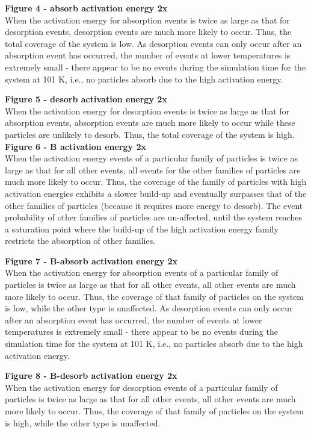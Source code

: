 \documentclass[11pt]{article}
\begin{document}
{\bf{Figure 4 - absorb activation energy 2x}}\\
When the activation energy for absorption events is twice as large as that for desorption events, desorption events are much more likely to occur. Thus, the total coverage of the system is low. As desorption events can only occur after an absorption event has occurred, the number of events at lower temperatures is extremely small  - there appear to be no events during the simulation time for the system at 101 K, i.e., no particles absorb due to the high activation energy. 


{\bf{Figure 5 - desorb activation energy 2x}}\\
When the activation energy for desorption events is twice as large as that for absorption events, absorption events are much more likely to occur while these particles are unlikely to desorb. Thus, the total coverage of the system is high. \\

{\bf{Figure 6 - B activation energy 2x}}\\
When the activation energy  events of a particular family of particles is twice as large as that for all other events, all events for the other families of particles are much more likely to occur. Thus, the coverage of the family of particles with high activation energies exhibits a slower build-up and eventually surpasses that of the other families of particles (because it requires more energy to desorb). The event probability of other families of particles are un-affected, until the system reaches a saturation point where the build-up of the high activation energy family restricts the absorption of other families.

{\bf{Figure 7 - B-absorb activation energy 2x }}\\
When the activation energy for absorption events of a particular family of particles is twice as large as that for all other events, all other events are much more likely to occur. Thus, the coverage of that family of particles on the system is low, while the other type is unaffected. As desorption events can only occur after an absorption event has occurred, the number of events at lower temperatures is extremely small  - there appear to be no events during the simulation time for the system at 101 K, i.e., no particles absorb due to the high activation energy. 


{\bf{Figure 8 - B-desorb activation energy 2x }}\\
When the activation energy for desorption events of a particular family of particles is twice as large as that for all other events, all other events are much more likely to occur. Thus, the coverage of that family of particles on the system is high, while the other type is unaffected. 
\end{document}
